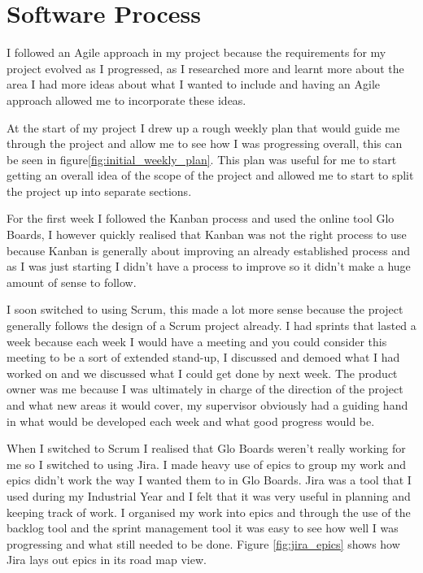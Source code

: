\chapter{Software Process}

I followed an Agile approach in my project because the requirements for my project evolved as I progressed, as I researched more and learnt more about the area I had more ideas about what I wanted to include and having an Agile approach allowed me to incorporate these ideas. 

At the start of my project I drew up a rough weekly plan that would guide me through the project and allow me to see how I was progressing overall, this can be seen in figure\ref{fig:initial_weekly_plan}. This plan was useful for me to start getting an overall idea of the scope of the project and allowed me to start to split the project up into separate sections.

For the first week I followed the Kanban process and used the online tool Glo Boards\cite{glo_board}, I however quickly realised that Kanban was not the right process to use because Kanban is generally about improving an already established process and as I was just starting I didn't have a process to improve so it didn't make a huge amount of sense to follow. 

I soon switched to using Scrum, this made a lot more sense because the project generally follows the design of a Scrum project already. I had sprints that lasted a week because each week I would have a meeting and you could consider this meeting to be a sort of extended stand-up, I discussed and demoed what I had worked on and we discussed what I could get done by next week. The product owner was me because I was ultimately in charge of the direction of the project and what new areas it would cover, my supervisor obviously had a guiding hand in what would be developed each week and what good progress would be.

When I switched to Scrum I realised that Glo Boards weren't really working for me so I switched to using Jira\cite{jira_site}. I made heavy use of epics to group my work and epics didn't work the way I wanted them to in Glo Boards. Jira was a tool that I used during my Industrial Year and I felt that it was very useful in planning and keeping track of work. I organised my work into epics and through the use of the backlog tool and the sprint management tool it was easy to see how well I was progressing and what still needed to be done. Figure \ref{fig:jira_epics} shows how Jira lays out epics in its road map view.

